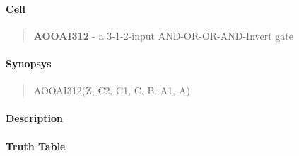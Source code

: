 \label{AOOAI312}
\paragraph{Cell}
\begin{quote}
    \textbf{AOOAI312} - a 3-1-2-input AND-OR-OR-AND-Invert gate
\end{quote}

\paragraph{Synopsys}
\begin{quote}
    AOOAI312(Z, C2, C1, C, B, A1, A)
\end{quote}

\paragraph{Description}

%

\paragraph{Truth Table}
%

